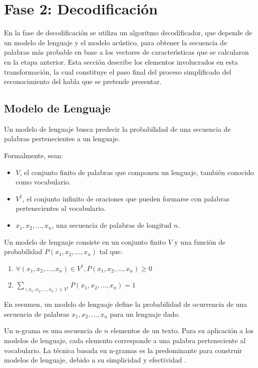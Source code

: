\section{Fase 2: Decodificaci\'on}
\label{sec:decoding}

En la fase de decodificaci\'on se utiliza un algoritmo decodificador, que depende de un modelo de lenguaje 
y el modelo ac\'ustico, para obtener la secuencia de palabras m\'as probable en base a los vectores 
de caracter{\'\i}sticas que se calcularon en la etapa anterior. 
Esta secci\'on describe los elementos involucrados en esta transformaci\'on, la cual constituye el paso
final del proceso simplificado del reconocimiento del habla que se pretende presentar.

\subsection{Modelo de Lenguaje}
Un modelo de lenguaje busca predecir la probabilidad de una secuencia de palabras pertenecientes a un lenguaje.

Formalmente, sean:
\begin{itemize}
	\item $V$, el conjunto finito de palabras que componen un lenguaje, tambi\'en conocido como vocabulario.
	\item $V^\dag$, el conjunto infinito de oraciones que pueden formarse con palabras pertenecientes 
		al vocabulario.
	\item $x_1,x_2,\ldots,x_n$, una secuencia de palabras de longitud $n$.
\end{itemize}

Un modelo de lenguaje \cite{CollinsLanguage} consiste en un conjunto finito $V$ y una funci\'on 
de probabilidad $P(x_1,x_2,\ldots,x_n)$ tal que:
\begin{enumerate}

\item $\forall (x_1,x_2,\ldots,x_n) \in V^\dag, P(x_1,x_2,\ldots,x_n) \ge 0$

\item $\displaystyle \sum_{(x_1,x_2,\ldots,x_n) \in V^\dag} P(x_1,x_2,\ldots,x_n) = 1$
\end{enumerate}


En resumen, un modelo de lenguaje define la probabilidad de ocurrencia de una secuencia de palabras
$x_1,x_2,\ldots,x_n$ para un lenguaje dado.

Un n-grama es una secuencia de $n$ elementos de un texto\cite{Tandon210}. Para su aplicación a los modelos de
lenguaje, cada elemento corresponde a una palabra perteneciente al vocabulario. La t\'ecnica basada
en n-gramas es la predominante para construir modelos de lenguaje, debido a su simplicidad y 
efectividad \cite{GaoComparative2010}.

